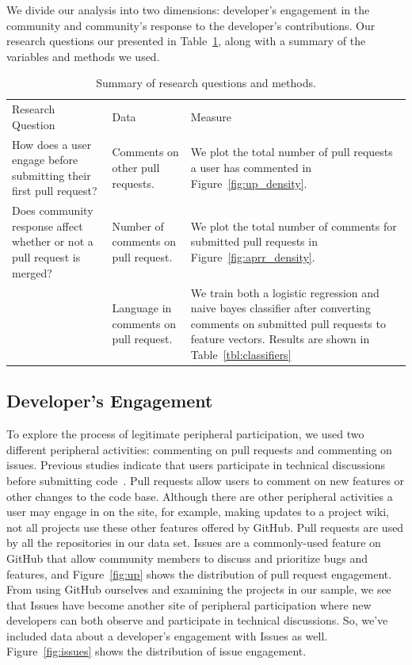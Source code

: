 \documentclass{sigchi}
\begin{document}
We divide our analysis into two dimensions: developer's engagement in the community and
community's response to the developer's contributions. Our research questions our presented in
Table~\ref{tbl:research_questions}, along with a summary of the variables and
methods we used.

\begin{table}[ht] \centering
\caption{Summary of research questions and methods.}
\label{tbl:research_questions}
\begin{tabular}{ p{2.1in} p{2.1in} p{2.3in} }
\hline\hline
Research Question
& Data                                  & Measure
\\
How does a user engage before submitting their first pull request?
& Comments on other pull requests.      & We plot the total number
of pull requests a user has commented in
Figure~\ref{fig:up_density}.
\\
Does community response affect whether or not a pull request is
merged? & Number of comments on pull request.   & We plot the
total number of comments for submitted pull requests in
Figure~\ref{fig:aprr_density}.
\\
~
& Language in comments on pull request. & We train both a
logistic regression and naive bayes classifier after
converting comments on submitted pull requests to feature
vectors. Results are shown in
Table~\ref{tbl:classifiers} \\
\hline
\end{tabular}
\end{table}

\subsection{Developer's Engagement}
To explore the process of legitimate peripheral participation, we used two different peripheral activities: commenting on pull requests and commenting on issues. Previous studies indicate that users participate in technical
discussions before submitting code~\cite{von_krogh_community_2003}. Pull
requests allow users to comment on new features or other changes to the code
base. Although there are other peripheral activities a user may engage in on the
site, for example, making updates to a project wiki, not all projects use these
other features offered by GitHub. Pull requests are used by all the repositories
in our data set. Issues are a commonly-used feature on GitHub that
allow community members to discuss and prioritize bugs and features, and Figure~\ref{fig:up} shows the distribution of pull request engagement. From using GitHub ourselves and examining the projects in our sample, we see that Issues have become another site of peripheral participation where new developers can both observe and participate in technical discussions. So, we've included data about a developer's engagement with Issues as well. Figure~\ref{fig:issues} shows the distribution of issue engagement.
\end{document}
